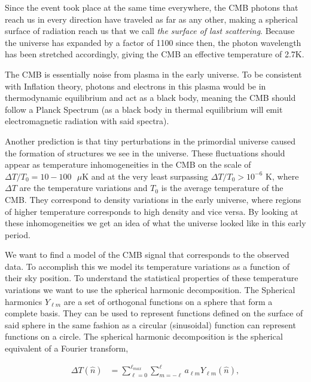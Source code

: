 \documentclass{emulateapj}
\begin{document}
Since the event took place at the same time everywhere, the CMB photons that reach us in every direction have traveled as far as any other, making a spherical surface of radiation reach us that we call \textit{the surface of last scattering}. Because the universe has expanded by a factor of 1100 since then, the photon wavelength has been stretched accordingly, giving the CMB an effective temperature of 2.7K.   

The CMB is essentially noise from plasma in the early universe. To be consistent with Inflation theory, photons and electrons in this plasma would be in thermodynamic equilibrium and act as a black body, meaning the CMB should follow a Planck Spectrum (as a black body in thermal equilibrium will emit electromagnetic radiation with said spectra).   

Another prediction is that tiny perturbations in the primordial universe caused the formation of structures we see in the universe. These fluctuations should appear as temperature inhomogeneities in the CMB on the scale of $\Delta T / T_0 = 10-100 \text{ }\mu$K and at the very least surpassing $\Delta T / T_0 >  10^{-6}$ K,
where $\Delta T$  are the temperature variations and $T_0$ is the average temperature of the CMB. They correspond to density variations in the early universe, where regions of higher temperature corresponds to high density and vice versa. By looking at these inhomogeneities we get an idea of what the universe looked like in this early period.  



\vspace{5mm}
We want to find a model of the CMB signal that corresponds to the observed data. To accomplish this we model its temperature variations as a function of their sky position. To understand the statistical properties of these temperature variations we want to use the spherical harmonic decomposition. The Spherical harmonics $Y_{\ell m}$ are a set of orthogonal functions on a sphere that form a complete basis. They can be used to represent functions defined on the surface of said sphere in the same fashion as a circular (sinusoidal) function can represent functions on a circle. The spherical harmonic decomposition is the spherical equivalent of a Fourier transform,

 \begin{equation}
 \label{dTn}
 \begin{array}{rl}
 \Delta T(\hat{n})  &= \sum_{\ell = 0}^{\ell_{max}} \sum_{m = -\ell}^{\ell} a_{\ell m}Y_{\ell m}(\hat{n}),\\
 \end{array}
 \end{equation}
\end{document}
